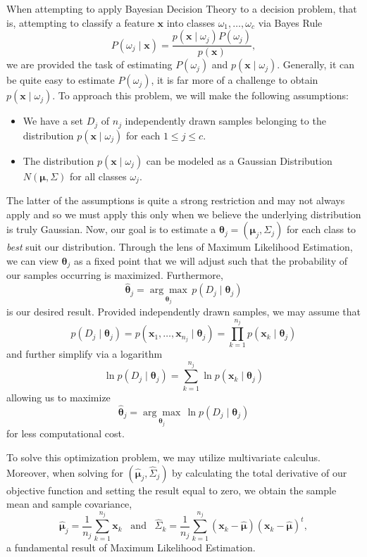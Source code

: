 \documentclass[ 12pt ]{article}
\begin{document}
When attempting to apply Bayesian Decision Theory to a decision problem, that is, attempting to classify a feature $\textbf{x}$ into classes $\omega_1, \hdots, \omega_c$ via Bayes Rule
$$P(\omega_j \mid \textbf{x}) = \frac{p( \textbf{x} \mid \omega_j ) P(\omega_j)}{p(\textbf{x})},$$ we are provided the task of estimating $P(\omega_j)$ and $p(\textbf{x} \mid \omega_j)$.
Generally, it can be quite easy to estimate $P(\omega_j)$, it is far more of a challenge to obtain $p(\textbf{x} \mid \omega_j)$. To approach this problem, we will make the following assumptions:
\begin{itemize}
    \item We have a set $D_j$ of $n_j$ independently drawn samples belonging to the distribution $p(\textbf{x} \mid \omega_j)$ for each $1 \leq j \leq c$.
    \item The distribution $p(\textbf{x} \mid \omega_j)$ can be modeled as a Gaussian Distribution $N(\boldsymbol{\mu}, \Sigma)$ for all classes $\omega_j$.
\end{itemize}
The latter of the assumptions is quite a strong restriction and may not always apply and so we must apply this only when we believe the underlying distribution is truly Gaussian.
Now, our goal is to estimate a $\boldsymbol{\theta}_j = ( \boldsymbol{\mu}_j, \Sigma_j )$ for each class to \textit{best} suit our distribution. Through the lens of Maximum Likelihood
Estimation, we can view $\boldsymbol{\theta}_j$ as a fixed point that we will adjust such that the probability of our samples occurring is maximized. Furthermore, $$\hat{\boldsymbol{\theta}}_j
= \underset{\boldsymbol{\theta}_j}{\arg \max}\, p(D_j \mid \boldsymbol{\theta}_j)$$ is our desired result. Provided independently drawn samples, we may assume that $$p(D_j \mid \boldsymbol{\theta}_j)
= p( \textbf{x}_1, \hdots, \textbf{x}_{n_j} \mid \boldsymbol{\theta}_j) = \prod_{k = 1}^{n_j} p(\textbf{x}_k \mid \boldsymbol{\theta}_j)$$ and further simplify via a logarithm $$\ln p(D_j \mid
\boldsymbol{\theta}_j) = \sum_{k = 1}^{n_j} \ln p(\textbf{x}_k \mid \boldsymbol{\theta}_j)$$ allowing us to maximize $$\hat{\boldsymbol{\theta}}_j = \underset{\boldsymbol{\theta}_j}{\arg \max}\,
\ln p(D_j \mid \boldsymbol{\theta}_j)$$ for less computational cost.

To solve this optimization problem, we may utilize multivariate calculus. Moreover, when solving for $(\hat{\boldsymbol{\mu}}_j, \hat{\Sigma}_j)$ by calculating the total derivative of our objective function and setting the
result equal to zero, we obtain the sample mean and sample covariance, $$\hat{\boldsymbol{\mu}}_j = \frac{1}{n_j} \sum_{k = 1}^{n_j} \textbf{x}_k\;\;\; \mathrm{and}\;\;\; \hat{\Sigma}_k =
\frac{1}{n_j} \sum_{k = 1}^{n_j} ( \textbf{x}_k - \hat{\boldsymbol{\mu}} )( \textbf{x}_k - \hat{\boldsymbol{\mu}})^t,$$ a fundamental result of Maximum Likelihood Estimation.
\end{document}

